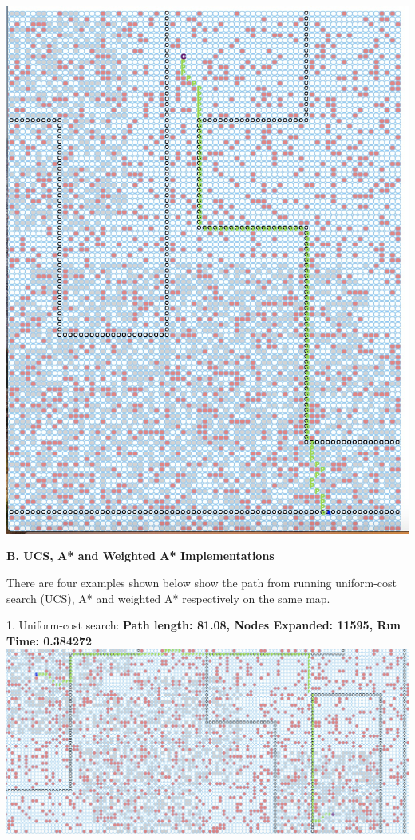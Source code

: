 \documentclass[12pt, letterpaper]{article}
\begin{document}
\medskip

\includegraphics[scale=0.40]{"a-map1-4"}


\pagebreak %


\noindent \textbf{B. UCS, A* and Weighted A* Implementations}

There are four examples shown below show the path from running uniform-cost search (UCS), A* and weighted A* respectively on the same map.

1. Uniform-cost search:\newline
\medskip
\textbf{Path length: 81.08, Nodes Expanded: 11595,	Run Time: 0.384272}\newline
\noindent \includegraphics[scale=0.21]{"b-map5-1-u"}\newline
\end{document}
